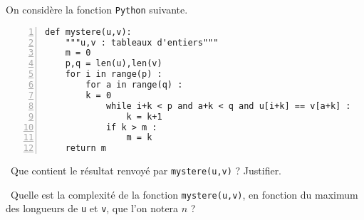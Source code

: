 On considère la fonction \texttt{Python} suivante. 
\begin{Verbatim}[gobble=0,numbers=left]
def mystere(u,v):
    """u,v : tableaux d'entiers"""
    m = 0
    p,q = len(u),len(v)
    for i in range(p) : 
        for a in range(q) :
	    k = 0
            while i+k < p and a+k < q and u[i+k] == v[a+k] : 
                k = k+1
            if k > m : 
                m = k
    return m
\end{Verbatim}

\medskip

\question\ Que contient le résultat renvoyé par \texttt{mystere(u,v)} ? Justifier. 

\medskip

\question\ Quelle est la complexité de la fonction \texttt{mystere(u,v)}, en fonction du maximum des longueurs de \texttt{u} et \texttt{v}, que l'on notera $n$ ? 